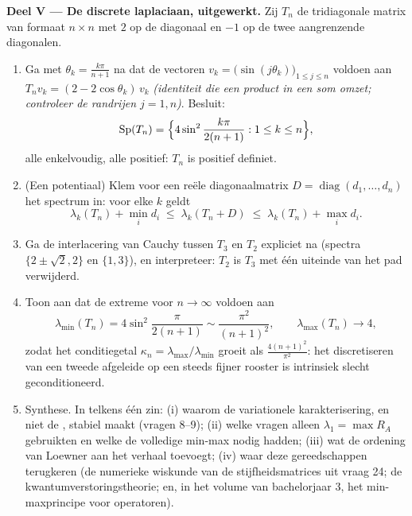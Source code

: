 \begin{problem}
\medskip
\noindent\textbf{Deel V --- De discrete laplaciaan, uitgewerkt.}
Zij $T_n$ de tridiagonale matrix van formaat $n \times n$ met $2$
op de diagonaal en $-1$ op de twee aangrenzende diagonalen.
\begin{enumerate}[resume]
  \item Ga met $\theta_k = \frac{k\pi}{n+1}$ na dat de vectoren
        $v_k = \bigl(\sin(j\theta_k)\bigr)_{1\leq j\leq n}$
        voldoen aan $T_nv_k = (2 - 2\cos\theta_k)\,v_k$
        \emph{(identiteit die een product in een som omzet;
        controleer de randrijen $j = 1, n$)}. Besluit:
        \[
        \operatorname{Sp}(T_n) = \Bigl\{4\sin^2
        \frac{k\pi}{2(n+1)} : 1 \leq k \leq n\Bigr\},
        \]
        alle enkelvoudig, alle positief: $T_n$ is positief
        definiet.
  \item (Een potentiaal) Klem voor een reële diagonaalmatrix $D =
        \operatorname{diag}(d_1, \dots, d_n)$ het spectrum in:
        voor elke $k$ geldt
        \[
        \lambda_k(T_n) + \min_i d_i \;\leq\;
        \lambda_k(T_n + D) \;\leq\; \lambda_k(T_n) + \max_i
        d_i .
        \]
  \item Ga de interlacering van Cauchy tussen $T_3$ en $T_2$
        expliciet na (spectra $\{2 \pm \sqrt2, 2\}$ en $\{1,
        3\}$), en interpreteer: $T_2$ is $T_3$ met één uiteinde
        van het pad verwijderd.
  \item Toon aan dat de extreme  voor $n \to \infty$
        voldoen aan
        \[
        \lambda_{\min}(T_n) = 4\sin^2\frac{\pi}{2(n+1)}
        \sim \frac{\pi^2}{(n+1)^2},
        \qquad
        \lambda_{\max}(T_n) \to 4 ,
        \]
        zodat het conditiegetal $\kappa_n =
        \lambda_{\max}/\lambda_{\min}$ groeit als
        $\frac{4(n+1)^2}{\pi^2}$: het discretiseren van een
        tweede afgeleide op een steeds fijner rooster is
        intrinsiek slecht geconditioneerd.
  \item Synthese. In telkens één zin: (i) waarom de variationele
        karakterisering, en niet de ,
         stabiel maakt (vragen 8--9); (ii) welke
        vragen alleen $\lambda_1 = \max R_A$ gebruikten en welke
        de volledige min-max nodig hadden; (iii) wat de ordening
        van Loewner aan het verhaal toevoegt; (iv) waar deze
        gereedschappen terugkeren (de numerieke wiskunde van de
        stijfheidsmatrices uit vraag 24; de
        kwantumverstoringstheorie; en, in het volume van
        bachelorjaar 3, het min-maxprincipe voor 
         operatoren).
\end{enumerate}
\end{problem}
